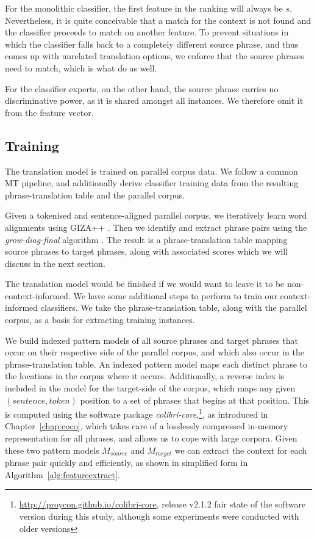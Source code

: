 For the monolithic classifier, the first feature in the ranking will always be
$s$. Nevertheless, it is quite conceivable that a match for the context is not
found and the classifier proceeds to match on another feature. To prevent
situations in which the classifier falls back to a completely different source
phrase, and thus comes up with unrelated translation options, we enforce that
the source phrases need to match, which is what \cite{Stroppa+07} do as
well.

For the classifier experts, on the other hand, the source
phrase carries no discriminative power, as it is shared amongst all instances. We
therefore omit it from the feature vector.

\subsection{Training}

The translation model is trained on parallel corpus data. We follow a common MT
pipeline, and additionally derive classifier training data from the
resulting phrase-translation table and the parallel corpus.

Given a tokenised and sentence-aligned parallel corpus, we iteratively learn
word alignments using GIZA++ \citep{GIZA}. Then we identify and extract phrase
pairs using the {\em grow-diag-final}\/ algorithm \citep{OchNey2003}. The
result is a phrase-translation table mapping source phrases to target
phrases, along with associated scores which we will discuss in the next
section. %

The translation model would be finished if we would want to leave it to be
non-context-informed. We have some additional steps to perform to train our
context-informed classifiers. We take the phrase-translation table, along with
the parallel corpus, as a basis for extracting training instances.

We build indexed pattern models of all source phrases and target phrases that
occur on their respective side of the parallel corpus, and which also occur in
the phrase-translation table. An indexed pattern model maps each distinct
phrase to the locations in the corpus where it occurs.  Additionally, a reverse
index is included in the model for the target-side of the corpus, which maps
any given $(sentence, token)$ position to a set of phrases that begins at that
position.  This is computed using the software package
\emph{colibri-core},\footnote{\url{http://proycon.github.io/colibri-core},
release v2.1.2 fair state of the software version during this study, although
some experiments were conducted with older versions}, as introduced in
Chapter~\ref{chap:coco},  which takes care of a losslessly compressed in-memory
representation for all phrases, and allows us to cope with large corpora. Given
these two pattern models $M_{source}$ and $M_{target}$ we can extract the
context for each phrase pair quickly and efficiently, as shown in simplified
form in Algorithm~\ref{alg:featureextract}.

